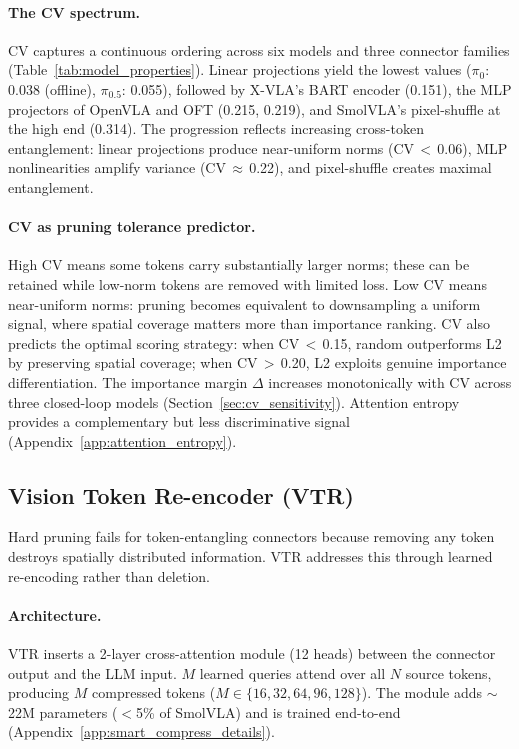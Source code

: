 \paragraph{The CV spectrum.}
CV captures a continuous ordering across six models and three connector families (Table~\ref{tab:model_properties}). Linear projections yield the lowest values ($\pi_{0}$: 0.038 (offline), $\pi_{0.5}$: 0.055), followed by X-VLA's BART encoder (0.151), the MLP projectors of OpenVLA and OFT (0.215, 0.219), and SmolVLA's pixel-shuffle at the high end (0.314). The progression reflects increasing cross-token entanglement: linear projections produce near-uniform norms (CV$\,{<}\,$0.06), MLP nonlinearities amplify variance (CV$\,{\approx}\,$0.22), and pixel-shuffle creates maximal entanglement.

\paragraph{CV as pruning tolerance predictor.}
High CV means some tokens carry substantially larger norms; these can be retained while low-norm tokens are removed with limited loss. Low CV means near-uniform norms: pruning becomes equivalent to downsampling a uniform signal, where spatial coverage matters more than importance ranking. CV also predicts the optimal scoring strategy: when CV$\,{<}\,$0.15, random outperforms L2 by preserving spatial coverage; when CV$\,{>}\,$0.20, L2 exploits genuine importance differentiation. The importance margin $\Delta$ increases monotonically with CV across three closed-loop models (Section~\ref{sec:cv_sensitivity}). Attention entropy provides a complementary but less discriminative signal (Appendix~\ref{app:attention_entropy}).

\subsection{Vision Token Re-encoder (VTR)}
\label{sec:vtr}

Hard pruning fails for token-entangling connectors because removing any token destroys spatially distributed information. VTR addresses this through learned re-encoding rather than deletion.

\paragraph{Architecture.}
VTR inserts a 2-layer cross-attention module (12 heads) between the connector output and the LLM input. $M$ learned queries attend over all $N$ source tokens, producing $M$ compressed tokens ($M \in \{16, 32, 64, 96, 128\}$). The module adds ${\sim}$22M parameters ($<$5\% of SmolVLA) and is trained end-to-end (Appendix~\ref{app:smart_compress_details}).
